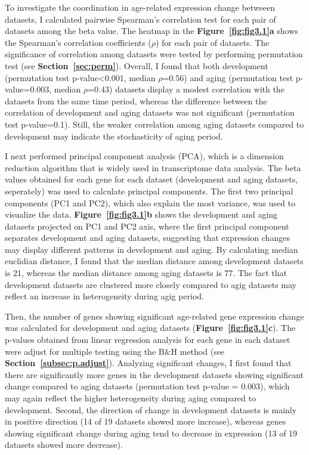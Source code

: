 To investigate the coordination in age-related expression change betweeen datasets, 
I calculated pairwise Spearman's correlation test for each pair of datasets among the beta value.
The heatmap in the \textbf{Figure~\ref{fig:fig3.1}a} shows the Spearman's correlation coefficients ($\rho$) for each pair of datasets.
The significance of correlation among datasets were tested by performing permutation test (see \textbf{Section~\ref{sec:perm}}).
Overall, I found that both development (permutation test p-value<0.001, median $\rho$=0.56) and aging (permutation test p-value=0.003, median $\rho$=0.43)
datasets display a modest correlation with the datasets from the same time period, 
whereas the difference between the correlation of development and aging datasets was not significant (permutation test p-value=0.1).
Still, the weaker correlation among aging datasets compared to development may indicate the stochasticity of aging period.

I next performed principal component analysis (PCA), which is a dimension reduction algorithm that is widely used in transcriptome data analysis. 
The beta values obtained for each gene for each dataset (development and aging datasets, seperately) was used to calculate principal components.
The first two principal components (PC1 and PC2), which also explain the most variance, was used to visualize the data.
\textbf{Figure~\ref{fig:fig3.1}b} shows the development and aging datasets projected on PC1 and PC2 axis, where
the first principal component separates development and aging datasets, suggesting that expression changes may display different patterns in development and aging.
By calculating median euclidian distance, I found that the median distance among development datasets is 21, 
whereas the median distance among aging datasets is 77. 
The fact that development datasets are clustered more closely compared to agig datasets may reflect an increase in heterogeneity during agig period.

Then, the number of genes showing significant age-related gene expression change was calculated for development and aging datasets (\textbf{Figure~\ref{fig:fig3.1}c}).
The p-values obtained from linear regression analysis for each gene in each dataset were adjust for multiple testing using the B{\&}H method (see \textbf{Section~\ref{subsec:p.adjust}}).
Analyzing significant changes, I first found that there are significantly more genes in the development datasets showing significant change compared to aging datasets (permutation test p-value = 0.003),
which may again reflect the higher heterogeneity during aging compared to development.
Second, the direction of change in development datasets is mainly in positive direction (14 of 19 datasets showed more increase), 
whereas genes showing significant change during aging tend to decrease in expression (13 of 19 datasets showed more decrease).

